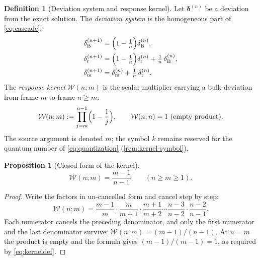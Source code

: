 \documentclass[11pt]{amsbook}
\theoremstyle{plain}
\newtheorem{proposition}[theorem]{Proposition}
\theoremstyle{definition}
\newtheorem{definition}[theorem]{Definition}
\theoremstyle{remark}
\newcommand{\uses}[1]{\par\nopagebreak\noindent{\footnotesize\emph{Uses: #1.}\par}}
\begin{document}
\begin{definition}[Deviation system and response kernel]\label{def:kernel}
Let $\boldsymbol{\delta}^{(n)}$ be a deviation from the exact solution. The \emph{deviation system} is the homogeneous part of \cref{eq:cascade}:
\begin{equation}\label{eq:deviation}
\begin{aligned}
\delta_{\mathrm B}^{(n+1)} &= \Bigl(1 - \tfrac{1}{n}\Bigr) \delta_{\mathrm B}^{(n)},\\
\delta_{\mathrm r}^{(n+1)} &= \Bigl(1 - \tfrac{1}{n}\Bigr) \delta_{\mathrm r}^{(n)} + \tfrac{1}{n}\,\delta_{\mathrm B}^{(n)},\\
\delta_{\mathrm m}^{(n+1)} &= \delta_{\mathrm m}^{(n)} + \tfrac{1}{n}\,\delta_{\mathrm r}^{(n)}.
\end{aligned}
\end{equation}
The \emph{response kernel} $\mathcal{W}(n; m)$ is the scalar multiplier carrying a bulk deviation from frame $m$ to frame $n \geq m$:
\begin{equation}\label{eq:kerneldef}
\mathcal{W}(n; m) := \prod_{j = m}^{n-1} \Bigl(1 - \frac{1}{j}\Bigr), \qquad \mathcal{W}(n; n) = 1 \ \text{(empty product)}.
\end{equation}
The source argument is denoted $m$; the symbol $k$ remains reserved for the quantum number of \cref{eq:quantization} (\cref{rem:kernel-symbol}).
\end{definition}

\begin{proposition}[Closed form of the kernel]\label{prop:kernel}
\begin{equation}\label{eq:kernel}
\mathcal{W}(n; m) = \frac{m-1}{n-1} \qquad (n \geq m \geq 1).
\end{equation}
\uses{\cref{eq:kerneldef}}
\end{proposition}

\begin{proof}
Write the factors in un-cancelled form and cancel step by step:
\begin{equation}\label{eq:kernel-telescope}
\mathcal{W}(n; m) = \frac{m-1}{m}\cdot\frac{m}{m+1}\cdot\frac{m+1}{m+2}\cdots\frac{n-3}{n-2}\cdot\frac{n-2}{n-1}.
\end{equation}
Each numerator cancels the preceding denominator, and only the first numerator and the last denominator survive: $\mathcal{W}(n; m) = (m-1)/(n-1)$. At $n = m$ the product is empty and the formula gives $(m-1)/(m-1) = 1$, as required by \cref{eq:kerneldef}.
\end{proof}
\end{document}
